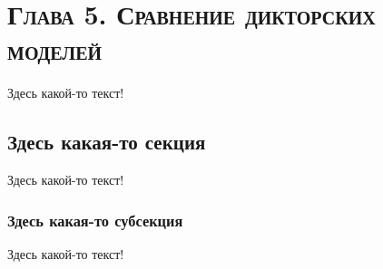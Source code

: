 \documentclass[12pt]{book}
\begin{document}
\chapter*{\textsc{Глава 5. Сравнение дикторских моделей}}

\thispagestyle{fancy}

\large{Здесь какой-то текст!}

\section{Здесь какая-то секция}

\large{Здесь какой-то текст!}

\subsection{Здесь какая-то субсекция}

\large{Здесь какой-то текст!}
\end{document}
